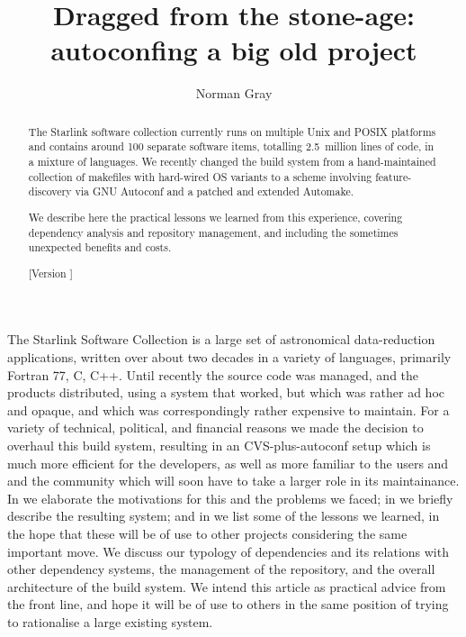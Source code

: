 \documentclass{speauth}
\begin{document}


\title{Dragged from the stone-age: autoconfing a big old project}

\author{Norman Gray\footnotemark}

\noreceived{}
\norevised{}
\noaccepted{}



\begin{abstract}
The Starlink software collection currently runs on multiple
Unix and POSIX platforms and contains around 100 separate software items,
totalling 2.5~million lines of code, in a mixture of languages.  We
recently changed the build system from a hand-maintained collection of
makefiles with hard-wired OS variants to a scheme involving
feature-discovery via GNU Autoconf and a patched and extended Automake.

We describe here the practical lessons we learned from this
experience, covering dependency analysis and repository management,
and including the sometimes unexpected benefits and costs.

[Version \RCSRevision]
\end{abstract}



The Starlink Software Collection \cite{draper05} is a large set of
astronomical data-reduction applications, written over about two
decades in a variety of languages, primarily Fortran 77, C, C++.  Until
recently the source code was managed, and the
products distributed, using a system that worked, but which was
rather ad hoc and opaque, and which was correspondingly rather
expensive to maintain.  For a variety of technical, political, and financial
reasons we made the decision to overhaul this build system, resulting
in an CVS-plus-autoconf setup which is much more efficient for the
developers, as well as more familiar to the users and and the
community which will soon have to take a larger role in its maintainance.
In  we elaborate the 
motivations for this and the problems we faced; in
 we briefly describe the resulting system; and
in  we list some of the lessons we learned, in
the hope that these will be of use to other projects considering the
same important move.  We discuss our typology of dependencies and its
relations with other dependency systems, the management of the
repository, and the overall architecture of the build system.
We intend this article as practical advice from the front line, and
hope it will be of use to others in the same position of trying to
rationalise a large existing system.
\end{document}
